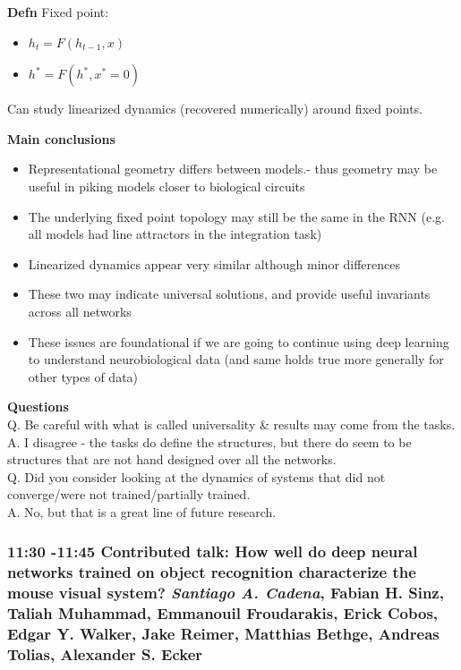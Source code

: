 \documentclass[12pt]{article}
\begin{document}
\textbf{Defn} Fixed point: 
\begin{itemize}
    \item $h_t = F(h_{t-1},x)$
    \item $h^* = F(h^*, x^* = 0)$
\end{itemize}

Can study linearized dynamics (recovered numerically) around fixed points. 

\textbf{Main conclusions} \\

\begin{itemize}
\item Representational geometry differs between models.- thus geometry may be useful in piking models closer to biological circuits
\item The underlying fixed point topology may still be the same in the RNN (e.g. all models had line attractors in the integration task)
\item Linearized dynamics appear very similar although minor differences
\item These two may indicate universal solutions, and provide useful invariants across all networks
\item These issues are foundational if we are going to continue using deep learning to understand neurobiological data (and same holds true more generally for other types of data)
\end{itemize}

\textbf{Questions} \\

Q. Be careful with what is called universality  \& results may come from the tasks. \\

A. I disagree - the tasks do define the structures, but there do seem to be structures that are not hand designed over all the networks. \\

Q. Did you consider looking at the dynamics of systems that did not converge/were not trained/partially trained. \\

A. No, but that is a great line of future research. 


\subsubsection{11:30 -11:45 Contributed talk: How well do deep neural networks trained on object recognition characterize the mouse visual system? \textit{Santiago A. Cadena}, Fabian H. Sinz, Taliah Muhammad, Emmanouil Froudarakis, Erick Cobos, Edgar Y. Walker, Jake Reimer, Matthias Bethge, Andreas Tolias, Alexander S. Ecker}
\end{document}
